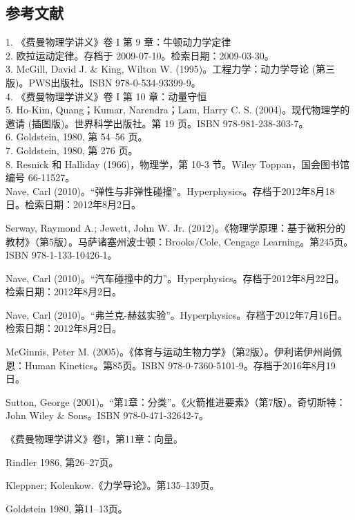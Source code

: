 \subsection{参考文献}
1. 《费曼物理学讲义》卷 I 第 9 章：牛顿动力学定律\\
2. 欧拉运动定律。存档于 2009-07-10。检索日期：2009-03-30。\\
3. McGill, David J. & King, Wilton W. (1995)。工程力学：动力学导论 (第三版)。PWS出版社。ISBN 978-0-534-93399-9。\\
4. 《费曼物理学讲义》卷 I 第 10 章：动量守恒\\
5. Ho-Kim, Quang；Kumar, Narendra；Lam, Harry C. S. (2004)。现代物理学的邀请 (插图版)。世界科学出版社。第 19 页。ISBN 978-981-238-303-7。\\
6. Goldstein, 1980, 第 54–56 页。\\
7. Goldstein, 1980, 第 276 页。\\
8. Resnick 和 Halliday (1966)，物理学，第 10-3 节。Wiley Toppan，国会图书馆编号 66-11527。\\
Nave, Carl (2010)。“弹性与非弹性碰撞”。Hyperphysics。存档于2012年8月18日。检索日期：2012年8月2日。

Serway, Raymond A.; Jewett, John W. Jr. (2012)。《物理学原理：基于微积分的教材》（第5版）。马萨诸塞州波士顿：Brooks/Cole, Cengage Learning。第245页。ISBN 978-1-133-10426-1。

Nave, Carl (2010)。“汽车碰撞中的力”。Hyperphysics。存档于2012年8月22日。检索日期：2012年8月2日。

Nave, Carl (2010)。“弗兰克-赫兹实验”。Hyperphysics。存档于2012年7月16日。检索日期：2012年8月2日。

McGinnis, Peter M. (2005)。《体育与运动生物力学》（第2版）。伊利诺伊州尚佩恩：Human Kinetics。第85页。ISBN 978-0-7360-5101-9。存档于2016年8月19日。

Sutton, George (2001)。“第1章：分类”。《火箭推进要素》（第7版）。奇切斯特：John Wiley & Sons。ISBN 978-0-471-32642-7。

《费曼物理学讲义》卷I，第11章：向量。

Rindler 1986, 第26–27页。

Kleppner; Kolenkow.《力学导论》。第135–139页。

Goldstein 1980, 第11–13页。